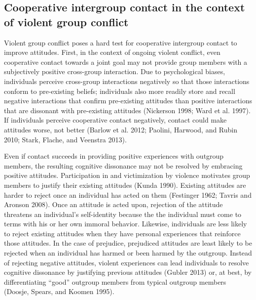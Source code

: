 \documentclass[11pt]{article}
\begin{document}
\hypertarget{cooperative-intergroup-contact-in-the-context-of-violent-group-conflict}{%
\subsection{Cooperative intergroup contact in the context of violent
group
conflict}\label{cooperative-intergroup-contact-in-the-context-of-violent-group-conflict}}

Violent group conflict poses a hard test for cooperative intergroup
contact to improve attitudes. First, in the context of ongoing violent
conflict, even cooperative contact towards a joint goal may not provide
group members with a subjectively positive cross-group interaction. Due
to psychological biases, individuals perceive cross-group interactions
negatively so that those interactions conform to pre-existing beliefs;
individuals also more readily store and recall negative interactions
that confirm pre-existing attitudes than positive interactions that are
dissonant with pre-existing attitudes (Nickerson 1998; Ward et al.
1997). If individuals perceive cooperative contact negatively, contact
could make attitudes worse, not better (Barlow et al. 2012; Paolini,
Harwood, and Rubin 2010; Stark, Flache, and Veenstra 2013).

Even if contact succeeds in providing positive experiences with outgroup
members, the resulting cognitive dissonance may not be resolved by
embracing positive attitudes. Participation in and victimization by
violence motivates group members to justify their existing attitudes
(Kunda 1990). Existing attitudes are harder to reject once an individual
has acted on them (Festinger 1962; Tavris and Aronson 2008). Once an
attitude is acted upon, rejection of the attitude threatens an
individual's self-identity because the the individual must come to terms
with his or her own immoral behavior. Likewise, individuals are less
likely to reject existing attitudes when they have personal experiences
that reinforce those attitudes. In the case of prejudice, prejudiced
attitudes are least likely to be rejected when an individual has harmed
or been harmed by the outgroup. Instead of rejecting negative attitudes,
violent experiences can lead individuals to resolve cognitive dissonance
by justifying previous attitudes (Gubler 2013) or, at best, by
differentiating ``good'' outgroup members from typical outgroup members
(Doosje, Spears, and Koomen 1995).
\end{document}
